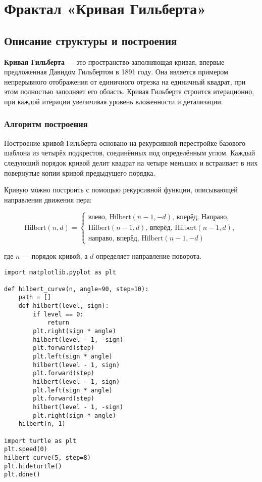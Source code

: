 





\section{Фрактал «Кривая Гильберта»}

\subsection{Описание структуры и построения}

\textbf{Кривая Гильберта} — это пространство-заполняющая кривая, впервые предложенная Давидом Гильбертом в 1891 году. Она является примером непрерывного отображения от единичного отрезка на единичный квадрат, при этом полностью заполняет его область. Кривая Гильберта строится итерационно, при каждой итерации увеличивая уровень вложенности и детализации.

\subsubsection{Алгоритм построения}

Построение кривой Гильберта основано на рекурсивной перестройке базового шаблона из четырёх подкрестов, соединённых под определённым углом. Каждый следующий порядок кривой делит квадрат на четыре меньших и встраивает в них повернутые копии кривой предыдущего порядка.

Кривую можно построить с помощью рекурсивной функции, описывающей направления движения пера:

\[
\text{Hilbert}(n, d) =
\begin{cases}
\text{влево},\, \text{Hilbert}(n-1, -d),\, \text{вперёд},\, \text{Направо}, \\
\text{Hilbert}(n-1, d),\, \text{вперёд},\, \text{Hilbert}(n-1, d), \\
\text{направо},\, \text{вперёд},\, \text{Hilbert}(n-1, -d)
\end{cases}
\]

где \( n \) — порядок кривой, а \( d \) определяет направление поворота.

\begin{lstlisting}[caption=Построение кривой Гильберта]
import matplotlib.pyplot as plt

def hilbert_curve(n, angle=90, step=10):
    path = []
    def hilbert(level, sign):
        if level == 0:
            return
        plt.right(sign * angle)
        hilbert(level - 1, -sign)
        plt.forward(step)
        plt.left(sign * angle)
        hilbert(level - 1, sign)
        plt.forward(step)
        hilbert(level - 1, sign)
        plt.left(sign * angle)
        plt.forward(step)
        hilbert(level - 1, -sign)
        plt.right(sign * angle)
    hilbert(n, 1)

import turtle as plt
plt.speed(0)
hilbert_curve(5, step=8)
plt.hideturtle()
plt.done()
\end{lstlisting}

